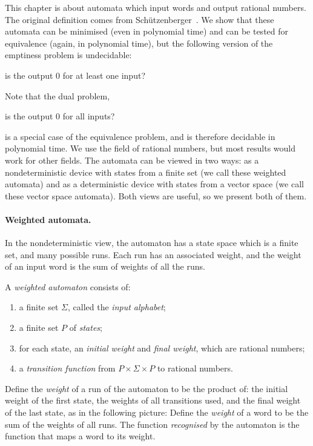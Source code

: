 This chapter is about automata which input words and output rational numbers. The original definition comes from Schützenberger~\cite{Schutzenberger:1961cf}. 
We show that these automata can be minimised  (even in  polynomial time) and  can be  tested for equivalence (again, in polynomial time),  but the following version of the emptiness problem is undecidable: 
\begin{center}
	is the output $0$ for at least one input?
\end{center}
 Note that the dual problem, 
 \begin{center}
 	is the output $0$ for all inputs?
 \end{center}
  is a special case of the equivalence problem, and is therefore decidable in polynomial time.  We use the field of rational numbers, but most results would work for other fields. The automata  can be viewed in two ways: as a nondeterministic device with states from a finite set (we call these weighted automata) and as a deterministic device with states from a vector space (we call these vector space automata). Both views are useful, so we present both of them. 

\paragraph*{Weighted automata.} In the nondeterministic view, the automaton has a state space which is a finite set, and many possible runs. Each run has an associated weight, and the weight of an input word is the sum of weights of all the runs.



\begin{definition}\label{def:weighted-automaton}
A \emph{weighted automaton} consists of:
\begin{enumerate}
	\item a finite set $\Sigma$, called the \emph{input alphabet};
	\item a finite set $P$ of \emph{states};
	\item for each state, an \emph{initial weight} and \emph{final weight}, which are rational numbers;
	\item a \emph{transition function} from $P \times \Sigma \times P$ to rational numbers.
\end{enumerate}
Define the \emph{weight} of  a run of the automaton to be the product of: the initial weight of the first state, the  weights of all transitions used, and the final weight of the last state, as in the following picture:
 Define the \emph{weight} of a word to be the sum of the weights of all runs.  The function \emph{recognised} by the automaton is the function that maps a word to its weight.
\end{definition}

